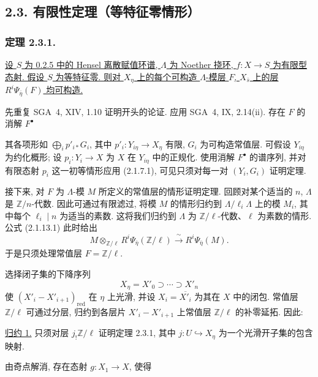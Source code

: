 \subsection*{2.3. 有限性定理（等特征零情形）}

\subsubsection*{定理 2.3.1.}
\underline{设 $S$ 为 0.2.5 中的 Hensel 离散赋值环谱, $\Lambda$ 为 Noether 挠环, $f:X\longrightarrow S$ 为有限型态射. 假设 $S$ 为等特征零. 则对 $X_\eta$ 上的每个可构造 $\Lambda$-模层 $F$, $X_{\bar s}$ 上的层 $R^i\Psi_{\bar\eta}(F)$ 均可构造.}

先重复 SGA~4, XIV, 1.10 证明开头的论证. 应用 SGA~4, IX, 2.14(ii). 存在 $F$ 的消解 $F^\bullet$
\begin{center}
\end{center}
其各项形如 $\bigoplus_i p'_{i*}G_i$, 其中 $p'_i:Y_{i\eta}\longrightarrow X_\eta$ 有限, $G_i$ 为可构造常值层. 可假设 $Y_{i\eta}$ 为约化概形; 设 $p_i:Y_i\longrightarrow X$ 为 $X$ 在 $Y_{i\eta}$ 中的正规化. 使用消解 $F^\bullet$ 的谱序列, 并对有限态射 $p_i$ 这一初等情形应用 (2.1.7.1), 可见只须对每一对 $(Y_i,G_i)$ 证明定理.

接下来, 对 $F$ 为 $\Lambda$-模 $M$ 所定义的常值层的情形证明定理. 回顾对某个适当的 $n$, $\Lambda$ 是 $\mathbb Z/n$-代数. 因此可通过有限滤过, 将模 $M$ 的情形归约到 $\Lambda/\ell_i\Lambda$ 上的模 $M_i$, 其中每个 $\ell_i\mid n$ 为适当的素数. 这将我们归约到 $\Lambda$ 为 $\mathbb Z/\ell$-代数、$\ell$ 为素数的情形. 公式 (2.1.13.1) 此时给出
\[
M\otimes_{\mathbb Z/\ell}
R^i\Psi_{\bar\eta}(\mathbb Z/\ell)
\xrightarrow{\ \sim\ }
R^i\Psi_{\bar\eta}(M).
\]
于是只须处理常值层 $F=\mathbb Z/\ell$.

选择闭子集的下降序列
\[
X_\eta=X'_0\supset\cdots\supset X'_n
\]
使 $(X'_i-X'_{i+1})_{\mathrm{red}}$ 在 $\eta$ 上光滑, 并设 $X_i=\overline{X'_i}$ 为其在 $X$ 中的闭包. 常值层 $\mathbb Z/\ell$ 可通过分层, 归约到各层片 $X'_i-X'_{i+1}$ 上常值层 $\mathbb Z/\ell$ 的补零延拓. 因此:

\medskip
\noindent\underline{归约 1.}
只须对层 $j_!\mathbb Z/\ell$ 证明定理 2.3.1, 其中 $j:U\hookrightarrow X_\eta$ 为一个光滑开子集的包含映射.

由奇点解消, 存在态射 $g:X_1\longrightarrow X$, 使得

